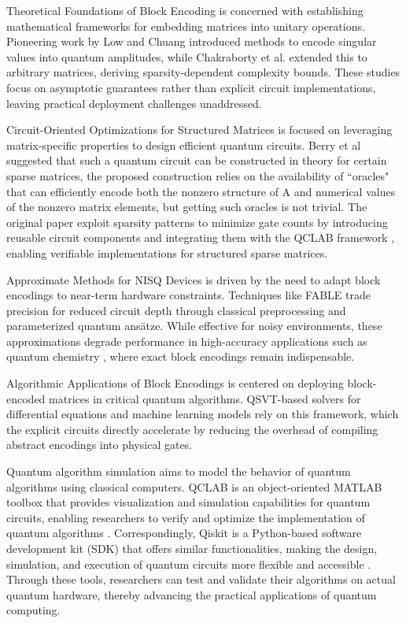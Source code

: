 \documentclass{article}
\begin{document}
    \label{sec:related_works}

    Theoretical Foundations of Block Encoding is concerned with establishing mathematical frameworks for embedding matrices into unitary operations. Pioneering work by Low and Chuang\cite{low2017optimal}
    introduced methods to encode singular values into quantum amplitudes, while Chakraborty et al.\cite{chakraborty2018power}
    extended this to arbitrary matrices, deriving sparsity-dependent complexity bounds. These studies focus on asymptotic guarantees rather than explicit circuit implementations, leaving practical deployment challenges unaddressed.

    Circuit-Oriented Optimizations for Structured Matrices is focused on leveraging matrix-specific properties to design efficient quantum circuits.
    Berry et al \cite{berry2015hamiltonian} suggested that such a quantum circuit can
    be constructed in theory for certain sparse matrices, the proposed construction relies on the availability of “oracles" that
    can efficiently encode both the nonzero structure of A and numerical values of the nonzero matrix elements, but getting such oracles is not trivial.
    The original paper exploit sparsity patterns to minimize gate counts by introducing reusable circuit components and integrating them with the QCLAB framework
    , enabling verifiable implementations for structured sparse matrices.

    Approximate Methods for NISQ Devices is driven by the need to adapt block encodings to near-term hardware constraints. Techniques like FABLE \cite{camps2022fable}
    trade precision for reduced circuit depth through classical preprocessing and parameterized quantum ansätze. While effective for noisy environments, these approximations degrade performance in high-accuracy applications such as quantum chemistry
    , where exact block encodings remain indispensable.

    Algorithmic Applications of Block Encodings is centered on deploying block-encoded matrices in critical quantum algorithms. QSVT-based solvers \cite{Gilyen2019}for differential equations
    and machine learning models rely on this framework, which the explicit circuits directly accelerate by reducing the overhead of compiling abstract encodings into physical gates.

    Quantum algorithm simulation aims to model the behavior of quantum algorithms using classical computers.
    QCLAB \cite{keip2025qclab} is an object-oriented MATLAB toolbox that provides visualization and simulation capabilities for quantum circuits, enabling researchers to verify and optimize the implementation of quantum algorithms .
    Correspondingly, Qiskit\cite{wille2019ibm} is a Python-based software development kit (SDK) that offers similar functionalities, making the design, simulation, and execution of quantum circuits more flexible and accessible .
    Through these tools, researchers can test and validate their algorithms on actual quantum hardware, thereby advancing the practical applications of quantum computing.
\end{document}
